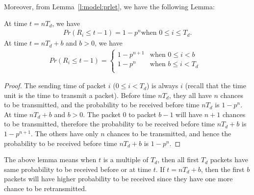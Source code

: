 
    Moreover, from Lemma~\ref{l:model:prlet}, we have the following Lemma: 
    \begin{lemma}
    \label{l:model:recv_td}
    At time $t = nT_d$, we have
    \begin{eqnarray*}
    Pr(R_i \leq t - 1) = 1 - p^n \textrm{when $0 \leq i \le T_d$.}
    \end{eqnarray*}
    At time $t = nT_d + b$ and $b>0$, we have
    \begin{eqnarray*}
        Pr(R_i \le t-1) = \left\{\begin{array}{ll}
        1 - p^{n+1} & \textrm{when $0 \le i < b$}\\
        1 - p^n     & \textrm{when $b \le i < T_d$ }\\
        \end{array}\right.
    \end{eqnarray*}
    \end{lemma}
    \begin{proof}
    The sending time of packet $i$ ($ 0 \leq i < T_d$) 
    is always $i$ (recall that the time unit is the time to transmit a packet). Before time $nT_d$, 
    they all have $n$ chances to be transmitted, and the probability to
    be received before time $nT_d$ is $1 - p^n$.
    At time $nT_d + b$ and $b >0$. The packet $0$ to packet $b-1$ will
    have $n+1$ chances to be transmitted, therefore the probability to be
    received before time $nT_d + b$ is $1 - p^{n+1}$. The others have only
    $n$ chances to be transmitted, and hence the probability to be
    received before time $nT_d + b$ is $1-p^n$. 
    \QED
    \end{proof}

    The above lemma means when $t$ is a multiple of $T_d$, then all first
    $T_d$ packets have same probability to be received before or at time $t$.
    If $t = nT_d + b$, then the first $b$ packets will have higher probability
    to be received since they have one more chance to be retransmitted.

